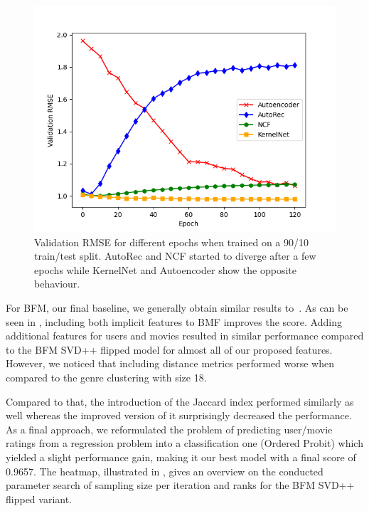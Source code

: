 \documentclass[10pt,conference,compsocconf]{IEEEtran}
\begin{document}
    \begin{figure}
        \includegraphics[width=\columnwidth]{figures/validation_plot.png}
        \caption{Validation RMSE for different epochs when trained on a 90/10 train/test split.
        AutoRec and NCF started to diverge after a few epochs while KernelNet and Autoencoder show the opposite behaviour.}
        \label{fig:validation}
    \end{figure}

    For BFM, our final baseline, we generally obtain similar results to~\cite{rendle_difficulty_2019}.
    As can be seen in , including both implicit features to BMF improves the score.
    Adding additional features for users and movies resulted in similar performance compared to the BFM SVD++ flipped model
    for almost all of our proposed features.
    However, we noticed that including distance metrics performed worse when compared to the genre clustering with size 18.

    Compared to that, the introduction of the Jaccard index performed similarly as well whereas the improved version of it surprisingly decreased the performance.
    As a final approach, we reformulated the problem of predicting user/movie ratings from a regression problem into a classification one (Ordered Probit) which yielded a slight performance gain, making it our best model with a final score of 0.9657.
    The heatmap, illustrated in , gives an overview on the conducted parameter search of sampling size per iteration and ranks for the BFM SVD++ flipped variant.
\end{document}
